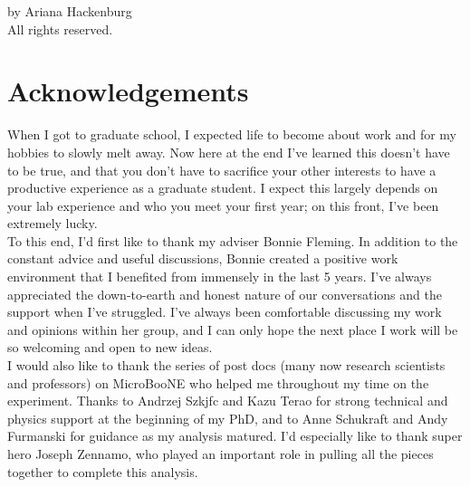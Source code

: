 \clearpage

\thispagestyle{empty}
\vspace*{\fill}
\begin{center}
 by Ariana Hackenburg\\
All rights reserved.
\end{center}
\vspace*{\fill}

\clearpage

\doublespacing


\pagestyle{fancy}%
\fancyhead[C]{}
\renewcommand{\headrulewidth}{0.4pt}%

\section*{Acknowledgements} 
\doublespacing

When I got to graduate school, I expected life to become about work and for my hobbies to slowly melt away. Now here at the end I've learned this doesn't have to be true, and that you don't have to sacrifice your other interests to have a productive experience as a graduate student. I expect this largely depends on your lab experience and who you meet your first year; on this front, I've been extremely lucky. \\

\noindent To this end, I'd first like to thank my adviser Bonnie Fleming.  In addition to the constant advice and useful discussions, Bonnie created a positive work environment that I benefited from immensely in the last 5 years. I've always appreciated the down-to-earth and honest nature of our conversations and the support when I've struggled.   I've always been comfortable discussing my work and opinions within her group, and I can only hope the next place I work will be so welcoming and open to new ideas. \\ 

\noindent I would also like to thank the series of post docs (many now research scientists and professors) on MicroBooNE who helped me throughout my time on the experiment. Thanks to Andrzej Szkjfc and Kazu Terao for strong technical and physics support at the beginning of my PhD, and to Anne Schukraft and Andy Furmanski for guidance as my analysis matured.  I'd especially like to thank super hero Joseph Zennamo, who played an important role in pulling all the pieces together to complete this analysis.  \\

